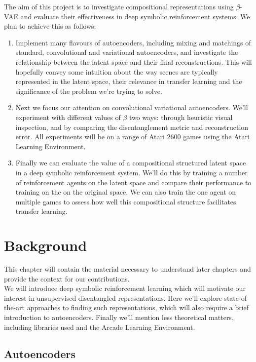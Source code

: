 \documentclass[12pt,twoside]{article}
\begin{document}
The aim of this project is to investigate compositional representations using $\beta$-VAE and evaluate their effectiveness in deep symbolic reinforcement systems. We plan to achieve this as follows:

\begin{enumerate}
\item Implement many flavours of autoencoders, including mixing and matchings of standard, convolutional and variational autoencoders, and investigate the relationship between the latent space and their final reconstructions. This will hopefully convey some intuition about the way scenes are typically represented in the latent space, their relevance in transfer learning and the significance of the problem we're trying to solve.
\item Next we focus our attention on convolutional variational autoencoders. We'll experiment with different values of $\beta$ two ways: through heuristic visual inspection, and by comparing the disentanglement metric and reconstruction error. All experiments will be on a range of Atari 2600 games using the Atari Learning Environment.
\item Finally we can evaluate the value of a compositional structured latent space in a deep symbolic reinforcement system. We'll do this by training a number of reinforcement agents on the latent space and compare their performance to training on the on the original space. We can also train the one agent on multiple games to assess how well this compositional structure facilitates transfer learning.
\end{enumerate}

\section{Background}
This chapter will contain the material necessary to understand later chapters and provide the context for our contributions.\\

We will introduce deep symbolic reinforcement learning which will motivate our interest in unsupervised disentangled representations. Here we'll explore state-of-the-art approaches to finding such representations, which will also require a brief introduction to autoencoders. Finally we'll mention less theoretical matters, including libraries used and the Arcade Learning Environment.

\subsection{Autoencoders}
\end{document}
